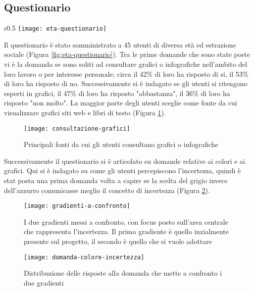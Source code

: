 \subsection{Questionario}
\begin{wrapfigure}{r}{0.5\textwidth}
    \centering
    \texttt{[image: eta-questionario]}
    \caption{Età degli utenti che hanno risposto al questionario}
    \label{fig:eta-questionario}
\end{wrapfigure}

Il questionario è stato somministrato a 45 utenti di diversa età ed estrazione sociale (Figura \ref{fig:eta-questionario}). Tra le prime domande che sono state poste vi è la domanda se sono soliti ad consultare grafici o infografiche nell'ambito del loro lavoro o per interesse personale; circa il 42\% di loro ha risposto di si, il 53\% di loro ha risposto di no. Successivamente si è indagato se gli utenti si ritengono esperti in grafici, il 47\% di loro ha risposto "abbastanza", il 36\% di loro ha risposto "non molto". La maggior parte degli utenti sceglie come fonte da cui visualizzare grafici siti web e libri di testo (Figura \ref{fig:consultazione-grafici}).\\

\begin{figure}[!ht] 
    \centering 
    \texttt{[image: consultazione-grafici]} 
    \caption{Principali fonti da cui gli utenti consultano grafici o infografiche}
    \label{fig:consultazione-grafici}
\end{figure}

Successivamente il questionario si è articolato su domande relative ai colori e ai grafici. Qui si è indagato su come gli utenti percepiscono l'incertezza, quindi è stat posta una prima domanda volta a capire se la scelta del grigio invece dell'azzurro comunicasse meglio il concetto di incertezza (Figura \ref{fig:gradienti-a-confronto}). 

\begin{figure}[!ht] 
    \centering 
    \texttt{[image: gradienti-a-confronto]} 
    \caption{I due gradienti messi a confronto, con focus posto sull'area centrale che rappresenta l'incertezza. Il primo gradiente è quello inzialmente presente sul progetto, il secondo è quello che si vuole adottare}
    \label{fig:gradienti-a-confronto}
\end{figure}


\begin{figure}[!ht] 
    \centering 
    \texttt{[image: domanda-colore-incertezza]}
    \caption{Distribuzione delle risposte alla domanda che mette a confronto i due gradienti}
    \label{fig:domanda-colore-incertezza}
\end{figure}

